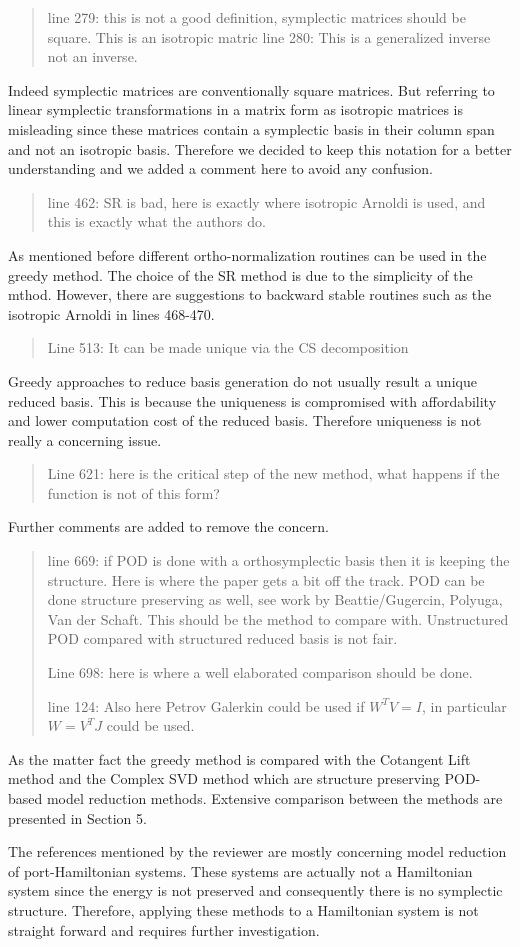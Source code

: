 \documentclass[a4paper]{article}
\newcommand{\breview}{\begin{quotation}\begin{bf}\noindent}
\newcommand{\ereview}{\end{bf}\end{quotation}}
\begin{document}
\breview
line 279: this is not a good definition, symplectic matrices should be square. This is an isotropic matric
line 280: This is a generalized inverse not an inverse.
\ereview

Indeed symplectic matrices are conventionally square matrices. But referring to linear symplectic transformations in a matrix form as isotropic matrices is misleading since these matrices contain a symplectic basis in their column span and not an isotropic basis. Therefore we decided to keep this notation for a better understanding and we added a comment here to avoid any confusion.


\breview
line 462: SR is bad, here is exactly where isotropic Arnoldi is used, and this is exactly what the authors do.
\ereview

As mentioned before different ortho-normalization routines can be used in the greedy method. The choice of the SR method is due to the simplicity of the mthod. However, there are suggestions to backward stable routines such as the isotropic Arnoldi in lines 468-470.

\breview
Line 513: It can be made unique via the CS decomposition
\ereview

Greedy approaches to reduce basis generation do not usually result a unique reduced basis. This is because the uniqueness is compromised with affordability and lower computation cost of the reduced basis. Therefore uniqueness is not really a concerning issue. 


\breview
Line 621: here is the critical step of the new method, what happens if the function is not of this form?
\ereview

Further comments are added to remove the concern.

\breview
line 669: if POD is done with a orthosymplectic basis then it is keeping the structure. Here is where the paper gets a bit off the track. POD can be done structure preserving as well, see work by Beattie/Gugercin, Polyuga, Van der Schaft. This should be the method to compare with. Unstructured POD compared with structured reduced basis is not fair.

Line 698: here is where a well elaborated comparison should be done.

line 124: Also here Petrov Galerkin could be used if $W^T V = I$, in particular $W = V^T J$ could be used.
\ereview

As the matter fact the greedy method is compared with the Cotangent Lift method and the Complex SVD method which are structure preserving POD-based model reduction methods. Extensive comparison between the methods are presented in Section 5.

The references mentioned by the reviewer are mostly concerning model reduction of port-Hamiltonian systems. These systems are actually not a Hamiltonian system since the energy is not preserved and consequently there is no symplectic structure. Therefore, applying these methods to a Hamiltonian system is not straight forward and requires further investigation.
\end{document}
